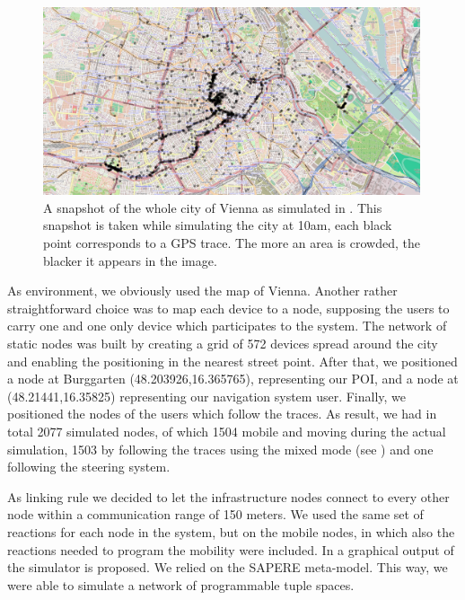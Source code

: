 \documentclass[12pt,a4paper,twoside,openright]{book}
\begin{document}
\begin{figure}[h]
 \includegraphics[width=0.99\textwidth]{img/vienna}
  \caption[Vienna simulated in \alchemist{}]{A snapshot of the whole city of Vienna as simulated in \alchemist{}. This snapshot is taken while simulating the city at 10am, each black point corresponds to a GPS trace. The more an area is crowded, the blacker it appears in the image.}
  \label{img:ahpc-vienna}
\end{figure}

As \alchemist{} environment, we obviously used the map of Vienna.
%
Another rather straightforward choice was to map each device to a node, supposing the users to carry one and one only device which participates to the system.
%
The network of static nodes was built by creating a grid of 572 devices spread around the city and enabling the positioning in the nearest street point.
%
After that, we positioned a node at Burggarten (48.203926,16.365765), representing our POI, and a node at (48.21441,16.35825) representing our navigation system user.
%
Finally, we positioned the nodes of the users which follow the traces.
%
As result, we had in total 2077 simulated nodes, of which 1504 mobile and moving during the actual simulation, 1503 by following the traces using the mixed mode (see ) and one following the steering system.

As linking rule we decided to let the infrastructure nodes connect to every other node within a communication range of 150 meters. 
%
We used the same set of reactions for each node in the system, but on the mobile nodes, in which also the reactions needed to program the mobility were included.
%
In  a graphical output of the simulator is proposed.
%
We relied on the SAPERE meta-model.
%
This way, we were able to simulate a network of programmable tuple spaces.
\end{document}
